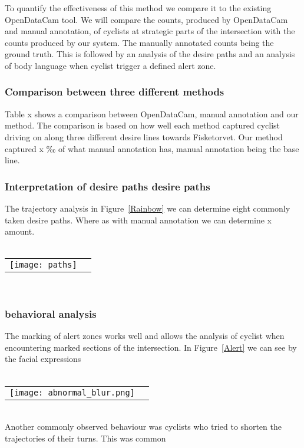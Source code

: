 To quantify the effectiveness of this method we compare it to the existing OpenDataCam tool.
We will compare the counts, produced by OpenDataCam and manual annotation, of cyclists at strategic parts of the intersection with the counts produced by our system. The manually annotated counts being the ground truth.
This is followed by an analysis of the desire paths and an analysis of body language when cyclist trigger a defined
alert zone.
\ \\ 

\subsubsection{Comparison between three different methods}
Table x shows a comparison between OpenDataCam, manual annotation and our method.
The comparison is based on how well each method captured cyclist driving on along three different 
desire lines towards Fisketorvet.
Our method captured x ‰ of what manual annotation has, manual annotation being the base line.
\ \\

\subsubsection{Interpretation of desire paths desire paths}
The trajectory analysis in Figure~\ref{Rainbow} we can determine eight commonly taken desire paths. 
Where as with manual annotation we can determine x amount.
\ \\
\raggedbottom
\ \\ 
\noindent
\begin{tabular}{@{}cc}
\texttt{[image: paths]} 
\end{tabular}
\label{traject}

\ \\
\subsubsection{behavioral analysis}
The marking of alert zones works well and allows the analysis of cyclist when encountering marked sections of the 
intersection. In Figure~\ref{Alert} we can see by the facial expressions 
\ \\
\raggedbottom
\ \\ 
\noindent
\begin{tabular}{@{}cc}
\texttt{[image: abnormal\_blur.png]} 
\end{tabular}
\label{Alert}
\ \\


Another commonly observed behaviour was cyclists who tried to shorten the trajectories of their turns.
This was common
